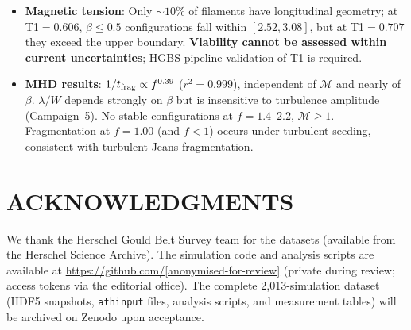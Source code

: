 \documentclass[twoside,twocolumn]{mnras}
\begin{document}
\begin{itemize}
    \item \textbf{Magnetic tension}: Only ${\sim}10\%$ of filaments have longitudinal
    geometry; at T1$=0.606$, $\beta \leq 0.5$ configurations fall within $[2.52, 3.08]$,
    but at T1$=0.707$ they exceed the upper boundary. \textbf{Viability cannot be assessed
    within current uncertainties}; HGBS pipeline validation of T1 is required.

    \item \textbf{MHD results}: $1/t_{\rm frag} \propto f^{0.39}$ ($r^2=0.999$), independent
    of $\mathcal{M}$ and nearly of $\beta$. $\lambda/W$ depends strongly on $\beta$ but is
    insensitive to turbulence amplitude (Campaign~5). No stable configurations at
    $f=1.4$--$2.2$, $\mathcal{M} \geq 1$. Fragmentation at $f = 1.00$ (and $f < 1$) occurs
    under turbulent seeding, consistent with turbulent Jeans fragmentation.

\end{itemize}

\section*{ACKNOWLEDGMENTS}

We thank the Herschel Gould Belt Survey team for the datasets (available from the
Herschel Science Archive). The simulation code and analysis scripts are available at
\url{https://github.com/[anonymised-for-review]} (private during review; access tokens
via the editorial office). The complete 2,013-simulation dataset (HDF5 snapshots,
\texttt{athinput} files, analysis scripts, and measurement tables) will be archived on
Zenodo upon acceptance.



\end{document}
